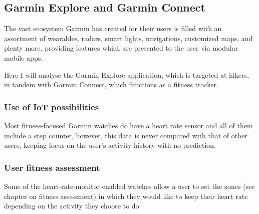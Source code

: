 \subsection{Garmin Explore and Garmin Connect}
The vast ecosystem Garmin has created for their users is filled with an assortment of wearables, radars, smart lights, navigations, customized maps, and plenty more, providing features which are presented to the user via modular mobile apps.

Here I will analyse the Garmin Explore application, which is targeted at hikers, in tandem with Garmin Connect, which functions as a fitness tracker.

\subsubsection*{Use of IoT possibilities}
Most fitness-focused Garmin watches do have a heart rate sensor and all of them include a step counter, however, this data is never compared with that of other users, keeping focus on the user's activity history with no prediction.
\subsubsection*{User fitness assessment}
Some of the heart-rate-monitor enabled watches allow a user to set the zones (see chapter on fitness assessment) in which they would like to keep their heart rate depending on the activity they choose to do.

